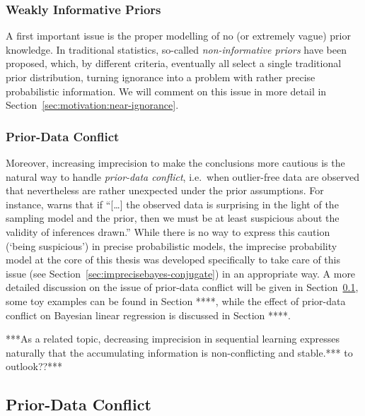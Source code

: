\subsubsection{Weakly Informative Priors}

A first important issue is the proper modelling of no (or extremely vague) prior knowledge.
In traditional statistics, so-called \emph{non-informative priors} have been proposed, which, by different criteria,
eventually all select a single traditional prior distribution,
turning ignorance into a problem with rather precise probabilistic information.
We will comment on this issue in more detail in Section~\ref{sec:motivation:near-ignorance}.

\subsubsection{Prior-Data Conflict}

Moreover, increasing imprecision to make the conclusions more cautious
is the natural way to handle \emph{prior-data conflict},
i.e.\ when outlier-free data are observed that nevertheless are rather unexpected under the prior assumptions.
For instance, \cite[p.~893]{2006:evans} warns that if
``[\ldots] the observed data is surprising in the light of the sampling model and the prior,
then we must be at least suspicious about the validity of inferences drawn.''
While there is no way to express this caution (`being suspicious') in precise probabilistic models,
the imprecise probability model at the core of this thesis was developed specifically to take care of this issue
(see Section~\ref{sec:imprecisebayes-conjugate}) in an appropriate way.
A more detailed discussion on the issue of prior-data conflict will be given in Section~\ref{sec:motivation:pdc},
some toy examples can be found in Section ****,
while the effect of prior-data conflict on Bayesian linear regression is discussed in Section ****.

***As a related topic, decreasing imprecision in sequential learning
expresses naturally that the accumulating information is non-conflicting and stable.*** to outlook??***


\subsection{Prior-Data Conflict}
\label{sec:motivation:pdc}

